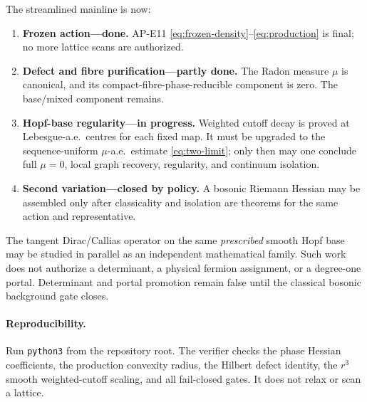 \documentclass[11pt]{article}
\begin{document}
The streamlined mainline is now:
\begin{enumerate}
 \item \textbf{Frozen action---done.}  AP-E11
       \eqref{eq:frozen-density}--\eqref{eq:production} is final; no more
       lattice scans are authorized.
 \item \textbf{Defect and fibre purification---partly done.}  The Radon
       measure $\mu$ is canonical, and its compact-fibre-phase-reducible
       component is zero.  The base/mixed component remains.
 \item \textbf{Hopf-base regularity---in progress.}  Weighted cutoff decay is
       proved at Lebesgue-a.e.\ centres for each fixed map.  It must be
       upgraded to the sequence-uniform $\mu$-a.e.\ estimate
       \eqref{eq:two-limit}; only then may one conclude full $\mu=0$, local
       graph recovery, regularity, and continuum isolation.
 \item \textbf{Second variation---closed by policy.}  A bosonic Riemann
       Hessian may be assembled only after classicality and isolation are
       theorems for the same action and representative.
\end{enumerate}

The tangent Dirac/Callias operator on the same \emph{prescribed} smooth Hopf
base may be studied in parallel as an independent mathematical family.
Such work does not authorize a determinant, a physical fermion assignment,
or a degree-one portal.  Determinant and portal promotion remain false until
the classical bosonic background gate closes.

\enlargethispage{3\baselineskip}
\paragraph{Reproducibility.}
Run \texttt{python3}
from the repository root.  The verifier checks the phase Hessian
coefficients, the production convexity radius, the Hilbert defect identity,
the $r^3$ smooth weighted-cutoff scaling, and all fail-closed gates.  It does
not relax or scan a lattice.
\end{document}
